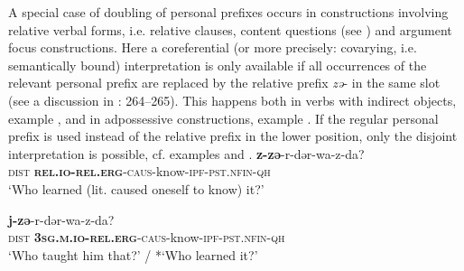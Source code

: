 \documentclass[output=paper]{langscibook}
\begin{document}
%
%
%
%


A special case of doubling of personal prefixes occurs in constructions involving relative verbal forms, i.e. relative clauses, content questions (see \citealt{Arkadiev2020}) and argument focus constructions. Here a coreferential (or more precisely: covarying, i.e. semantically bound) interpretation is only available if all occurrences of the relevant personal prefix are replaced by the relative prefix \textit{z{ə}}{}- in the same slot (see a discussion in \citealt{OHerin2002}: 264–265). This happens both in verbs with indirect objects, example , and in adpossessive constructions, example . If the regular personal prefix is used instead of the relative prefix in the lower position, only the disjoint interpretation is possible, cf. examples  and .
 \ea 
\label{ex:Arkadiev:50}
    \ea 
    \label{ex:Arkadiev:50a}
     \textbf{{z-z{ə}}}{{}-r-d{ə}r-wa-z-da?}\\
       \textsc{dist}  \textbf{\textsc{rel.io-rel.erg}}\textsc{{}-caus-}know-\textsc{ipf-pst.nfin-qh}\\
    \glt ‘Who learned (lit. caused oneself to know) it?’
    
    \ex 
    \label{ex:Arkadiev:50b}
     \textbf{{j-z{ə}}}{{}-r-d{ə}r-wa-z-da?}\\
    \textsc{dist}  \textbf{\textsc{3sg.m.io-rel.erg}}\textsc{{}-caus}{}-know-\textsc{ipf-pst.nfin-qh}\\
    \glt ‘Who taught him that?’ / *‘Who learned it?’
\z
\z

\ea
\label{ex:Arkadiev:51}
    
\z
\z
\end{document}
